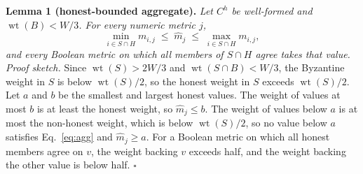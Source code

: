 \textbf{Lemma 1 (honest-bounded aggregate).} \emph{Let $C^{h}$ be well-formed
and $\operatorname{wt}(B) < W/3$. For every numeric metric $j$,}
\[
\min_{i \in S \cap H} m_{i,j} \;\le\; \widehat m_j \;\le\; \max_{i \in S \cap H} m_{i,j},
\]
\emph{and every Boolean metric on which all members of $S \cap H$ agree takes
that value.} \emph{Proof sketch.} Since $\operatorname{wt}(S) > 2W/3$ and
$\operatorname{wt}(S \cap B) < W/3$, the Byzantine weight in $S$ is below
$\operatorname{wt}(S)/2$, so the honest weight in $S$ exceeds
$\operatorname{wt}(S)/2$. Let $a$ and $b$ be the smallest and largest honest
values. The weight of values at most $b$ is at least the honest weight, so
$\widehat m_j \le b$. The weight of values below $a$ is at most the
non-honest weight, which is below $\operatorname{wt}(S)/2$, so no value below
$a$ satisfies Eq.~\eqref{eq:agg} and $\widehat m_j \ge a$. For a Boolean
metric on which all honest members agree on $v$, the weight backing $v$
exceeds half, and the weight backing the other value is below half.
$\square$

